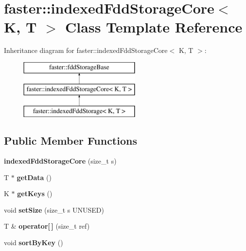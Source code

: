 \hypertarget{classfaster_1_1indexedFddStorageCore}{}\section{faster\+:\+:indexed\+Fdd\+Storage\+Core$<$ K, T $>$ Class Template Reference}
\label{classfaster_1_1indexedFddStorageCore}
Inheritance diagram for faster\+:\+:indexed\+Fdd\+Storage\+Core$<$ K, T $>$\+:\begin{figure}[H]
\begin{center}
\leavevmode
\includegraphics[height=3.000000cm]{classfaster_1_1indexedFddStorageCore}
\end{center}
\end{figure}
\subsection*{Public Member Functions}
\begin{DoxyCompactItemize}
\item 
\hypertarget{classfaster_1_1indexedFddStorageCore_a8ef8f11997d28af03b02f84a632beeea}{}{\bfseries indexed\+Fdd\+Storage\+Core} (size\+\_\+t s)\label{classfaster_1_1indexedFddStorageCore_a8ef8f11997d28af03b02f84a632beeea}

\item 
\hypertarget{classfaster_1_1indexedFddStorageCore_ae8768192a6af9e667e0d08a5a11c983d}{}T $\ast$ {\bfseries get\+Data} ()\label{classfaster_1_1indexedFddStorageCore_ae8768192a6af9e667e0d08a5a11c983d}

\item 
\hypertarget{classfaster_1_1indexedFddStorageCore_a93fcf724a2560a94cf46bfaa6729f9f6}{}K $\ast$ {\bfseries get\+Keys} ()\label{classfaster_1_1indexedFddStorageCore_a93fcf724a2560a94cf46bfaa6729f9f6}

\item 
\hypertarget{classfaster_1_1indexedFddStorageCore_a8f39ec402c0c3307ae3df58e1a172743}{}void {\bfseries set\+Size} (size\+\_\+t s U\+N\+U\+S\+E\+D)\label{classfaster_1_1indexedFddStorageCore_a8f39ec402c0c3307ae3df58e1a172743}

\item 
\hypertarget{classfaster_1_1indexedFddStorageCore_a37e52c70dbda4c1f1ea4d9f60884d869}{}T \& {\bfseries operator\mbox{[}$\,$\mbox{]}} (size\+\_\+t ref)\label{classfaster_1_1indexedFddStorageCore_a37e52c70dbda4c1f1ea4d9f60884d869}

\item 
\hypertarget{classfaster_1_1indexedFddStorageCore_a36e8a7c036dad67bde3e34925b65f68d}{}void {\bfseries sort\+By\+Key} ()\label{classfaster_1_1indexedFddStorageCore_a36e8a7c036dad67bde3e34925b65f68d}

\end{DoxyCompactItemize}
